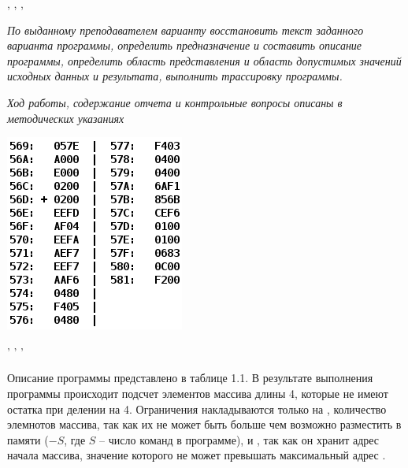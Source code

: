 \tableofcontents


\newpage
\Chapter{\lab\ \labnumber}{\labtheme}{}

\begin{center}
, , ,
\end{center}
\noindent

\textit{По выданному преподавателем варианту восстановить текст заданного варианта программы, определить предназначение и составить описание программы, определить область представления и область допустимых значений исходных данных и результата, выполнить трассировку программы.}

\textit{Ход работы, содержание отчета и контрольные вопросы описаны в методических указаниях}

\begin{center}
    \includegraphics[width=0.3\paperwidth]{figures/task.png}
\end{center}
\begin{center}
    ' ' '
\end{center}

\newpage
{}


Описание программы представлено в таблице 1.1. %
В результате выполнения программы происходит подсчет элементов массива длины 4, которые не имеют остатка при делении на 4.
Ограничения накладываются только на , количество элемнотов массива, так как их не может быть больше чем возможно разместить в памяти ($-S$, где $S$ -- число команд в программе), и , так как он хранит адрес начала массива, значение которого не может превышать максимальный адрес .


